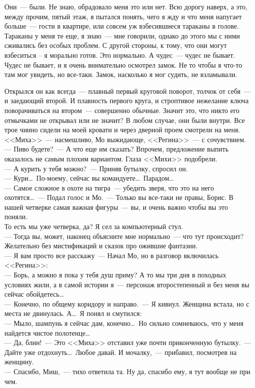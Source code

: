 Они~--- были. Не знаю, обрадовало меня это или нет. Всю дорогу наверх, а это, 
между прочим, пятый этаж, я пытался понять, чего я жду и что меня напугает 
больше~--- гости в квартире, или совсем уж взбесившиеся тараканы в голове. 
Тараканы у меня те еще, я знаю~--- мне говорили, однако до этого мы с ними 
сживались без особых проблем. С другой стороны, к тому, что они могут 
взбеситься 
– я морально готов. Это нормально. А чудес~--- чудес не бывает. Чудес не 
бывает, и 
я очень внимательно осмотрел замок. Не то чтобы я что-то там мог увидеть, но 
все-таки. Замок, насколько я мог судить, не взламывали.

Открылся он как всегда~--- плавный первый круговой поворот, толчок от себя~--- 
и заедающий второй. И плавность первого круга, и строптивое нежелание ключа 
поворачиваться на втором~--- совершенно обычные. Значит это, что никто его 
отмычками не открывал или не значит? В любом случае, они были внутри. Все трое 
чинно сидели на моей кровати и через дверной проем смотрели на меня. 
<<Миха>>~--- насмешливо, Мо выжидающе, <<Регина>>~--- с сочувствием.\\
--- Пиво будете?~--- А что еще им сказать? Впрочем, предложение выпить оказалось 
не самым плохим вариантом. Глаза <<Михи>> подобрели.\\
--- А курить у тебя можно?~--- Приняв бутылку, спросил он.\\
--- Кури\ldots\ По-моему, сейчас вы командуете\ldots\ Парадом\ldots\\
--- Самое сложное в охоте на тигра~--- убедить зверя, что это на него 
охотятся\ldots~--- Подал голос и Мо.~--- Только вы все-таки не правы, Борис. В нашей четверке 
самая важная фигуры~--- вы, и очень важно чтобы вы это поняли.\\
То есть мы уже четверка, да? Я сел за компьютерный стул.\\
--- Тогда вы, может, наконец объясните мне нормально~--- что тут происходит? 
Желательно без мистификаций и сказок про ожившие фантазии.\\
--- Я вам просто все расскажу~--- Начал Мо, но в разговор включилась <<Регина>>:\\
--- Борь, а можно я пока у тебя душ приму? А то мы три дня в походных условиях 
жили, а в самой истории я~--- персонаж второстепенный и без меня вы сейчас 
обойдетесь\ldots\\
--- Конечно, по общему коридору и направо.~--- Я кивнул. Женщина встала, но с 
места не двинулась. А\ldots\ Я понял и смутился:\\
--- Мыло, шампунь я сейчас дам, конечно\ldots\ Но сильно сомневаюсь, что у меня 
найдется чистое полотенце\ldots\\
--- Да, блин!~--- Это <<Миха>> отставил уже почти приконченную бутылку.~--- Дайте 
уже отдохнуть\ldots\ Любое давай. И мочалку,~--- прибавил, посмотрев на женщину.\\
--- Спасибо, Миш,~--- тихо ответила та. Ну да, спасибо ему, я тут вообще не при 
чем.
 
